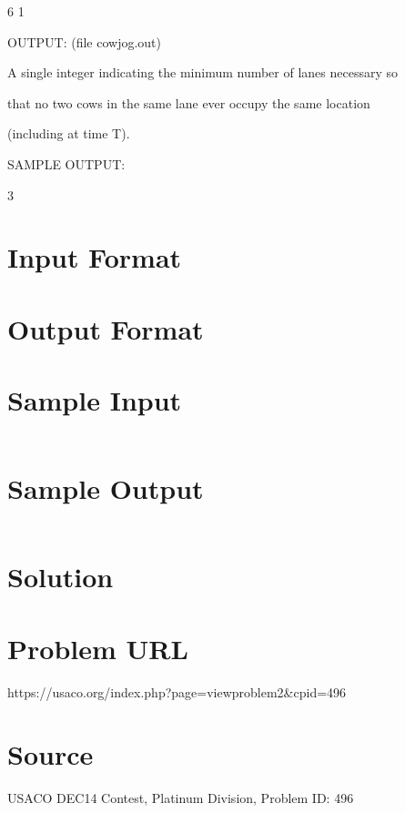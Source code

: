 \documentclass[12pt]{article}
\begin{document}
6 1



OUTPUT: (file cowjog.out)



A single integer indicating the minimum number of lanes necessary so

that no two cows in the same lane ever occupy the same location

(including at time T).



SAMPLE OUTPUT:



3




\section*{Input Format}


\section*{Output Format}


\section*{Sample Input}
\begin{verbatim}

\end{verbatim}

\section*{Sample Output}
\begin{verbatim}

\end{verbatim}

\section*{Solution}


\section*{Problem URL}
https://usaco.org/index.php?page=viewproblem2&cpid=496

\section*{Source}
USACO DEC14 Contest, Platinum Division, Problem ID: 496
\end{document}
